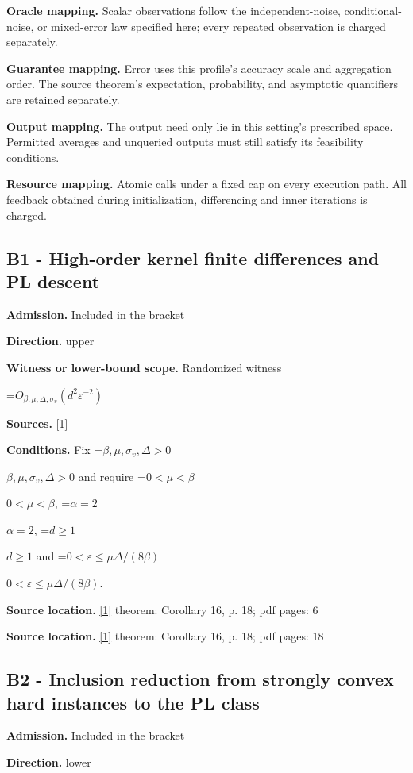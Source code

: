 \documentclass[10pt,a4paper]{article}
\newcommand{\AtlasMath}[1]{\par\begingroup\centering\setbox0=\hbox{$\displaystyle #1$}\ifdim\wd0>1.4\linewidth\typeout{ATLAS WIDE FORMULA: \the\wd0}\fi\ifdim\wd0>\linewidth\resizebox{\linewidth}{!}{\box0}\else\box0\fi\par\endgroup}
\newcommand{\AtlasInlineMath}[1]{\begingroup\setbox0=\hbox{$#1$}\ifdim\wd0>.4\linewidth\endgroup\AtlasMath{#1}\else\endgroup$#1$\fi}
\begin{document}
\textbf{Oracle mapping.} Scalar observations follow the independent-noise, conditional-noise, or mixed-error law specified here; every repeated observation is charged separately.

\textbf{Guarantee mapping.} Error uses this profile's accuracy scale and aggregation order. The source theorem's expectation, probability, and asymptotic quantifiers are retained separately.

\textbf{Output mapping.} The output need only lie in this setting's prescribed space. Permitted averages and unqueried outputs must still satisfy its feasibility conditions.

\textbf{Resource mapping.} Atomic calls under a fixed cap on every execution path. All feedback obtained during initialization, differencing and inner iterations is charged.

\subsection{B1 - High-order kernel finite differences and PL descent}
\textbf{Admission.} Included in the bracket

\textbf{Direction.} upper

\textbf{Witness or lower-bound scope.} Randomized witness

\AtlasMath{O_{\beta,\mu,\Delta,\sigma_v}(d^2\varepsilon^{-2})}
\textbf{Sources.} \href{https://jmlr.org/papers/volume25/23-0733/23-0733.pdf}{[1]}

\textbf{Conditions.} Fix \AtlasInlineMath{\beta,\mu,\sigma_v,\Delta>0} and require \AtlasInlineMath{0<\mu<\beta}, \AtlasInlineMath{\alpha=2}, \AtlasInlineMath{d\ge1} and \AtlasInlineMath{0<\varepsilon\le\mu\Delta/(8\beta)}.

\textbf{Source location.} \href{https://jmlr.org/papers/volume25/23-0733/23-0733.pdf}{[1]} theorem: Corollary 16, p. 18; pdf pages: 6

\textbf{Source location.} \href{https://jmlr.org/papers/volume25/23-0733/23-0733.pdf}{[1]} theorem: Corollary 16, p. 18; pdf pages: 18

\subsection{B2 - Inclusion reduction from strongly convex hard instances to the PL class}
\textbf{Admission.} Included in the bracket

\textbf{Direction.} lower
\end{document}
